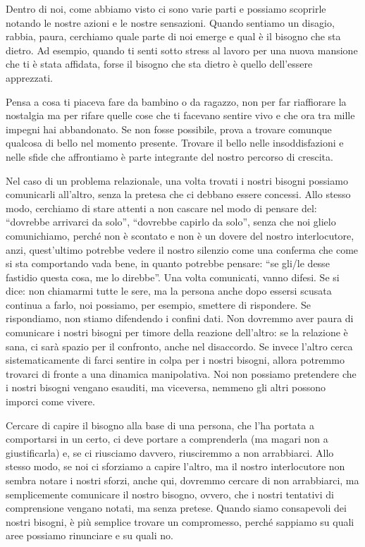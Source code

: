 \documentclass[12pt]{book} %
\begin{document}
Dentro di noi, come abbiamo visto ci sono varie parti e possiamo scoprirle notando le nostre azioni e le nostre
sensazioni. Quando sentiamo un disagio, rabbia, paura, cerchiamo quale parte di noi emerge e qual è il bisogno che sta
dietro. Ad esempio, quando ti senti sotto stress al lavoro per una nuova mansione che ti è stata affidata, forse il bisogno che sta dietro è quello dell'essere apprezzati.

Pensa a cosa ti piaceva fare da bambino o da ragazzo, non per far riaffiorare la nostalgia ma per rifare quelle cose che
ti facevano sentire vivo e che ora tra mille impegni hai abbandonato. Se non fosse possibile, prova a trovare comunque
qualcosa di bello nel momento presente. Trovare il bello nelle insoddisfazioni e nelle sfide che affrontiamo è parte
integrante del nostro percorso di crescita.

Nel caso di un problema relazionale, una volta trovati i nostri bisogni possiamo comunicarli all'altro, senza la pretesa che ci debbano essere concessi.
Allo stesso modo, cerchiamo di stare attenti a non cascare nel modo di pensare del: “dovrebbe arrivarci da solo”, “dovrebbe capirlo da solo”, senza che noi glielo comunichiamo, perché non è scontato e non è un dovere del nostro interlocutore, anzi, quest'ultimo potrebbe vedere il nostro silenzio come una
conferma che come si sta comportando vada bene, in quanto potrebbe pensare: “se gli/le desse fastidio questa cosa, me
lo direbbe”. Una volta comunicati, vanno difesi. Se si dice: non chiamarmi tutte le sere, ma la persona anche dopo
essersi scusata continua a farlo, noi possiamo, per esempio, smettere di rispondere. Se rispondiamo, non stiamo
difendendo i confini dati. Non dovremmo aver paura di comunicare i nostri bisogni per timore della reazione dell’altro: se la relazione è sana, ci sarà spazio per il confronto, anche nel disaccordo. Se invece l’altro cerca sistematicamente di farci sentire in colpa per i nostri bisogni, allora potremmo trovarci di fronte a una dinamica manipolativa. Noi non
possiamo pretendere che i nostri bisogni vengano esauditi, ma viceversa, nemmeno gli altri possono imporci come vivere. 

Cercare di capire il bisogno alla base di una persona, che l'ha portata a comportarsi in un certo,
ci deve portare a comprenderla (ma magari non a giustificarla) e, se ci riusciamo davvero, riusciremmo a non
arrabbiarci. Allo stesso modo, se noi ci sforziamo a capire l'altro, ma il nostro interlocutore non sembra notare i
nostri sforzi, anche qui, dovremmo cercare di non arrabbiarci, ma semplicemente comunicare il nostro bisogno, ovvero,
che i nostri tentativi di comprensione vengano notati, ma senza pretese. Quando siamo consapevoli dei nostri bisogni, è più semplice
trovare un compromesso, perché sappiamo su quali aree possiamo rinunciare e su quali no.
\end{document}
